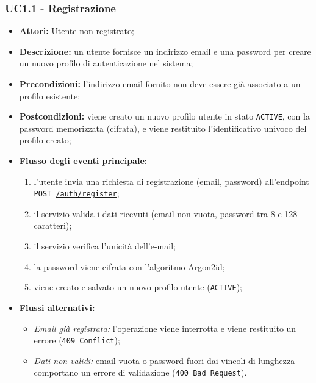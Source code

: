 \subsubsection{UC1.1 - Registrazione}
\begin{itemize}
    \item \textbf{Attori:} Utente non registrato;
    \item \textbf{Descrizione:} un utente fornisce un indirizzo email e una password per creare un nuovo profilo di autenticazione nel sistema;
    \item \textbf{Precondizioni:} l'indirizzo email fornito non deve essere già associato a un profilo esistente;
    \item \textbf{Postcondizioni:} viene creato un nuovo profilo utente in stato \texttt{ACTIVE}, con la password memorizzata (cifrata), e viene restituito l'identificativo univoco del profilo creato;
    \item \textbf{Flusso degli eventi principale:}
    \begin{enumerate}
        \item l'utente invia una richiesta di registrazione (email, password) all'endpoint \texttt{POST \url{/auth/register}};
        \item il servizio valida i dati ricevuti (email non vuota, password tra 8 e 128 caratteri);
        \item il servizio verifica l'unicità dell'e-mail;
        \item la password viene cifrata con l'algoritmo Argon2id;
        \item viene creato e salvato un nuovo profilo utente (\texttt{ACTIVE});
    \end{enumerate}
    \item \textbf{Flussi alternativi:}
    \begin{itemize}
        \item \emph{Email già registrata:} l'operazione viene interrotta e viene restituito un errore (\texttt{409 Conflict});
        \item \emph{Dati non validi:} email vuota o password fuori dai vincoli di lunghezza comportano un errore di validazione (\texttt{400 Bad Request}).
    \end{itemize}
\end{itemize}

